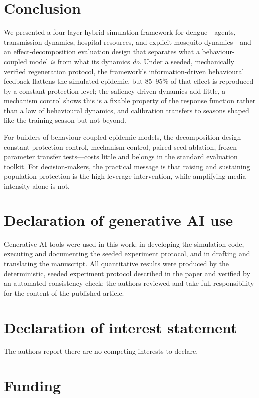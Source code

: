 \documentclass[]{interact}
\begin{document}
\section{Conclusion}

We presented a four-layer hybrid simulation framework for dengue---agents, transmission dynamics, hospital resources, and explicit mosquito dynamics---and an effect-decomposition evaluation design that separates what a behaviour-coupled model \emph{is} from what its dynamics \emph{do}. Under a seeded, mechanically verified regeneration protocol, the framework's information-driven behavioural feedback flattens the simulated epidemic, but 85--95\% of that effect is reproduced by a constant protection level; the saliency-driven dynamics add little, a mechanism control shows this is a fixable property of the response function rather than a law of behavioural dynamics, and calibration transfers to seasons shaped like the training season but not beyond. 

For builders of behaviour-coupled epidemic models, the decomposition design---constant-protection control, mechanism control, paired-seed ablation, frozen-parameter transfer tests---costs little and belongs in the standard evaluation toolkit. For decision-makers, the practical message is that raising and sustaining population protection is the high-leverage intervention, while amplifying media intensity alone is not.

\section*{Declaration of generative AI use}

Generative AI tools were used in this work: in developing the simulation code, executing and documenting the seeded experiment protocol, and in drafting and translating the manuscript. All quantitative results were produced by the deterministic, seeded experiment protocol described in the paper and verified by an automated consistency check; the authors reviewed and take full responsibility for the content of the published article.

\section*{Declaration of interest statement}

The authors report there are no competing interests to declare.

\section*{Funding}
\end{document}
